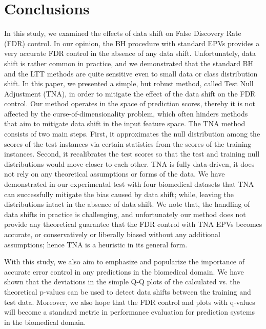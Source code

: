 \documentclass{article}
\begin{document}
\section{Conclusions}


In this study, we examined the effects of data shift on False Discovery Rate (FDR) control. In our opinion, the BH procedure with standard EPVs provides a very accurate FDR control in the absence of any data shift. Unfortunately, data shift is rather common in practice, and we demonstrated that the standard BH and the LTT methods are quite sensitive even to small data or class distribution shift. In this paper, we presented a simple, but robust method, called Test Null Adjustment (TNA), in order to mitigate the effect of the data shift on the FDR control. Our method operates in the space of prediction scores, thereby it is not affected by the curse-of-dimensionality problem, which often hinders methods that aim to mitigate data shift in the input feature space. The TNA method consists of two main steps. First, it approximates the null distribution among the scores of the test instances via certain statistics from the scores of the training instances. Second, it recalibrates the test scores so that the test and training null distributions would move closer to each other. TNA is fully data-driven, it does not rely on any theoretical assumptions or forms of the data. We have demonstrated in our experimental test with four biomedical datasets that TNA can successfully mitigate the bias caused by data shift; while, leaving the distributions intact in the absence of data shift. We note that, the handling of data shifts in practice is challenging, and unfortunately our method does not provide any theoretical guarantee that the FDR control with TNA EPVs becomes accurate, or conservatively or liberally biased without any additional assumptions; hence TNA is a heuristic in its general form.  

With this study, we also aim to emphasize and popularize the importance of accurate error control in any predictions in the biomedical domain. We have shown that the deviations in the simple Q-Q plots of the calculated vs. the theoretical p-values can be used to detect data shifts between the training and test data. Moreover, we also hope that the FDR control and plots with q-values will become a standard metric in performance evaluation for prediction systems in the biomedical domain.





\end{document}
